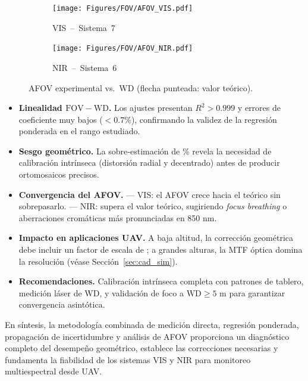     \begin{figure}[H]
      \centering
      \begin{subfigure}[b]{.49\linewidth}
        \texttt{[image: Figures/FOV/AFOV\_VIS.pdf]}
        \caption{VIS – Sistema 7}
      \end{subfigure}
      \hfill
      \begin{subfigure}[b]{.49\linewidth}
        \texttt{[image: Figures/FOV/AFOV\_NIR.pdf]}
        \caption{NIR – Sistema 6}
      \end{subfigure}
      \caption{AFOV experimental vs.\ WD (flecha punteada: valor teórico).}
      \label{fig:afov}
    \end{figure}

    
    \begin{itemize}
      \item \textbf{Linealidad \(\mathrm{FOV}\!-\!\mathrm{WD}\).}  
            Los ajustes presentan \(R^{2}>0.999\) y errores de coeficiente
            muy bajos (\(<0.7\%\)), confirmando la validez de la regresión
            ponderada en el rango estudiado.
      \item \textbf{Sesgo geométrico.}  
            La sobre‐estimación de  \% revela la necesidad de
            calibración intrínseca (distorsión radial y decentrado) antes de
            producir ortomosaicos precisos.
      \item \textbf{Convergencia del AFOV.}  
            — VIS: el AFOV crece hacia el teórico sin sobrepasarlo.  
            — NIR: supera el valor teórico, sugiriendo 
            \emph{focus breathing} o aberraciones cromáticas más
            pronunciadas en 850 nm.
      \item \textbf{Impacto en aplicaciones UAV.}  
            A baja altitud, la corrección geométrica debe incluir un
            factor de escala de ; a grandes alturas, la MTF óptica
            domina la resolución (véase Sección \ref{sec:cad_sim}).
      \item \textbf{Recomendaciones.}  
            Calibración intrínseca completa con patrones de
            tablero, medición láser de WD, y validación de foco a
            \(\mathrm{WD}\geq5\) m para garantizar convergencia asintótica.
    \end{itemize}
    
    En síntesis, la metodología combinada de medición directa, regresión
    ponderada, propagación de incertidumbre y análisis de AFOV proporciona
    un diagnóstico completo del desempeño geométrico, establece las
    correcciones necesarias y fundamenta la fiabilidad de los
    sistemas VIS y NIR para monitoreo multiespectral desde UAV.  
    
